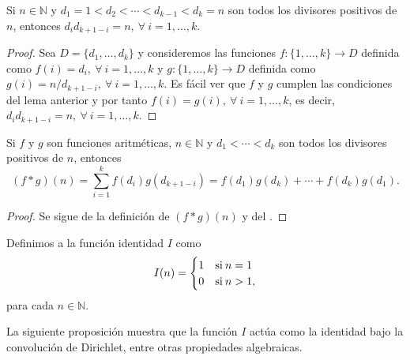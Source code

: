 \begin{lemma}\label{lemma:div1}
Si $n\in\mathbb{N}$ y $d_1=1<d_2<\cdots<d_{k-1}<d_k=n$ son todos los divisores positivos de $n$, entonces $d_i d_{k+1-i}=n,\:\forall \: i=1,\ldots,k$.
\end{lemma}
\begin{proof}
Sea $D=\{d_1,\ldots,d_k\}$ y consideremos las funciones $f: \{1,\ldots,k\} \longrightarrow D$ definida como $f(i)=d_i,\:\forall \: i=1,\ldots,k$ y $g: \{1,\ldots,k\} \longrightarrow D$ definida como $g(i)=n/d_{k+1-i},\:\forall \: i=1,\ldots,k$. Es fácil ver que $f$ y $g$ cumplen las condiciones del lema anterior y por tanto $f(i)=g(i),\:\forall \: i=1,\ldots,k$, es decir, $d_i d_{k+1-i}=n,\:\forall \: i=1,\ldots,k$.
\end{proof}

\begin{proposition}\label{prop:dir1}
Si $f$ y $g$ son funciones aritméticas, $n\in\mathbb{N}$ y $d_1<\cdots<d_k$ son todos los divisores positivos de $n$, entonces 
\begin{equation*}
	(f*g)(n)=\sum_{i=1}^{k} f(d_i)g(d_{k+1-i})=f(d_1)g(d_k)+\cdots+f(d_k)g(d_1).
\end{equation*}
\begin{proof}
Se sigue de la definición de $(f*g)(n)$ y del .
\end{proof}
\end{proposition}

\begin{definition}
Definimos a la función identidad $I$ como 
\begin{equation*}
	I(n) =
		\begin{cases}
			\hfil 1 & \text{si} \: n=1 \\ 
			\hfil 0 & \text{si} \: n>1,
		\end{cases}
\end{equation*}
para cada $n\in\mathbb{N}$.
\end{definition}

La siguiente proposición muestra que la función $I$ actúa como la identidad bajo la convolución de Dirichlet, entre otras propiedades algebraicas.

